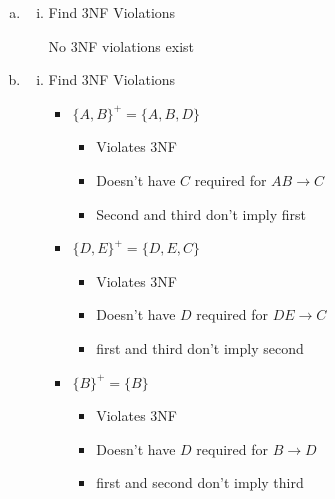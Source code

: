 \documentclass[12pt]{article}
\begin{document}
\begin{enumerate}[1.]
\begin{enumerate}[a)]
\begin{enumerate}[i)]
\begin{enumerate}[1.]
                \bigskip

            \end{enumerate}
        \end{enumerate}

        \item

        \begin{enumerate}[i)]
            \item Find 3NF Violations

            \bigskip

            \color{red}
            No 3NF violations exist
            \color{black}

        \end{enumerate}


        \item

        \begin{enumerate}[i)]
            \item Find 3NF Violations

            \bigskip

            \color{red}
            \begin{itemize}
                \item $\{A,B\}^+ = \{A,B,D\}$
                \begin{itemize}
                    \item Violates 3NF
                    \item Doesn't have $C$ required for $AB \to C$
                    \item Second and third don't imply first
                \end{itemize}

                \item $\{D,E\}^+ = \{D,E,C\}$
                \begin{itemize}
                    \item Violates 3NF
                    \item Doesn't have $D$ required for $DE \to C$
                    \item first and third don't imply second
                \end{itemize}

                \item $\{B\}^+ = \{B\}$
                \begin{itemize}
                    \item Violates 3NF
                    \item Doesn't have $D$ required for $B \to D$
                    \item first and second don't imply third
                \end{itemize}
            \end{itemize}
            \color{black}


\end{enumerate}
\end{enumerate}
\end{enumerate}
\end{document}
